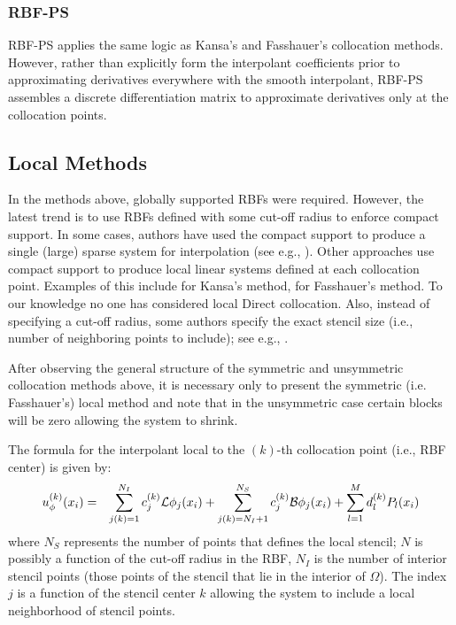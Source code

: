 \documentclass{report}
\begin{document}
{%
\subsubsection{RBF-PS}

RBF-PS applies the same logic as Kansa's and Fasshauer's collocation methods. However, rather than explicitly form the interpolant coefficients prior to approximating derivatives everywhere with the smooth interpolant, RBF-PS assembles a discrete differentiation matrix to approximate derivatives only at the collocation points. 

\subsection{Local Methods}
In the methods above, globally supported RBFs were required. However, the latest trend is to use RBFs defined with some cut-off radius to enforce compact support. In some cases, authors have used the compact support to produce a single (large) sparse system for interpolation (see e.g., \cite{Wang2002, Liu2005, Correa2007, Yang2008, Lin2009}). Other approaches use compact support to produce local linear systems defined at each collocation point. Examples of this include \cite{Sarler2006, Vertnik2006} for Kansa's method, \cite{Stevens2008a, Stevens2009a, Stevens2009b} for Fasshauer's method. To our knowledge no one has considered local Direct collocation.  Also, instead of specifying a cut-off radius, some authors specify the exact stencil size (i.e., number of neighboring points to include); see e.g., \cite{Divo2007, Stevens2009b}. 

After observing the general structure of the symmetric and unsymmetric collocation methods above, it is necessary only to present the symmetric (i.e. Fasshauer's) local method and note that in the unsymmetric case certain blocks will be zero allowing the system to shrink. 

The formula for the interpolant local to the $(k)$-th collocation point (i.e., RBF center) is given by: 
\begin{eqnarray}
u^{(k)}_\phi(x_i) & = & \sum_{j(k)=1}^{N_{I}}  c_j^{(k)} \mathcal{L}\phi_j(x_i) + \sum_{j(k)=N_{I} + 1}^{N_{S}} c^{(k)}_j\mathcal{B}\phi_j(x_i) + \sum_{l=1}^{M}d^{(k)}_l P_l(x_i)
\label{eqn:fasshauer_local_approx}
\end{eqnarray}
where $N_{S}$ represents the number of points that defines the local stencil; $N$ is possibly a function of the cut-off radius in the RBF, $N_{I}$ is the number of interior stencil points (those points of the stencil that lie in the interior of $\Omega$). The index $j$ is a function of the stencil center $k$ allowing the system to include a local neighborhood of stencil points.

}
\end{document}
